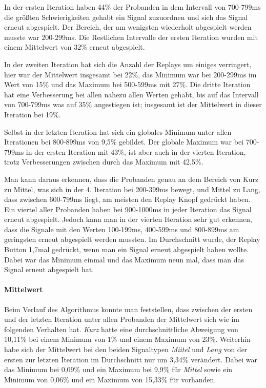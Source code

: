 In der ersten Iteration haben 44\% der Probanden in dem Intervall von 700-799ms die gr{\"o}{\ss}ten Schwierigkeiten gehabt ein Signal zuzuordnen und sich das Signal erneut abgespielt. 
Der Bereich, der am wenigsten wiederholt abgespielt werden musste war 200-299ms. 
Die Restlichen Intervalle der ersten Iteration wurden mit einem Mittelwert von 32\% erneut abgespielt.

In der zweiten Iteration hat sich die Anzahl der Replays um einiges verringert, hier war der Mittelwert insgesamt bei 22\%, das Minimum war bei 200-299ms im Wert von 15\% und das Maximum bei 500-599ms mit 27\%.  
Die dritte Iteration hat eine Verbesserung bei allen nahezu allen Werten gehabt, bis auf das Intervall von 700-799ms was auf 35\% angestiegen ist; insgesamt ist der Mittelwert in dieser Iteration bei 19\%. 

Selbst in der letzten Iteration hat sich ein globales Minimum unter allen Iterationen bei 800-899ms von 9,5\% gebildet. Der globale Maximum war bei 700-799ms in der ersten Iteration mit 43\%, ist aber auch in der vierten Iteration, trotz Verbesserungen zwischen durch das Maximum mit 42,5\%. 

Man kann daraus erkennen, dass die Probanden genau an dem Bereich von Kurz zu Mittel, was sich in der 4. Iteration bei 200-399ms bewegt, und Mittel zu Lang, dass zwischen 600-799ms liegt, am meisten den Replay Knopf gedr{\"u}ckt haben. 
Ein viertel aller Probanden haben bei 900-1000ms in jeder Iteration das Signal erneut abgespielt. 
Jedoch kann man in der vierten Iteration sehr gut erkennen, dass die Signale mit den Werten 100-199ms, 400-599ms und 800-899ms am geringsten erneut abgespielt werden mussten.
Im Durchschnitt wurde, der Replay Button 1,7mal gedr{\"u}ckt, wenn man ein Signal erneut abgespielt haben wollte. 
Dabei war das Minimum einmal und das Maximum neun mal, dass man das Signal erneut abgespielt hat.

\paragraph{Mittelwert}
Beim Verlauf des Algorithmus konnte man feststellen, dass zwischen der ersten und der letzten Iteration unter allen Probanden der Mittelwert sich wie im folgenden Verhalten hat. 
\textit{Kurz} hatte eine durchschnittliche Abweigung von 10,11\% bei einem Minimum von 1\% und einem Maximum von 23\%. 
Weiterhin habe sich der Mittelwert bei den beiden Signaltypen \textit{Miitel} und \textit{Lang} von der ersten zur letzten Iteration im Durchschnitt nur um 3,34\% ver{\"a}ndert.
Dabei war das Minimum bei 0,09\% und ein Maximum bei 9,9\% f{\"u}r \textit{Mittel} sowie ein Minimum von 0,06\% und ein Maximum von 15,33\% f{\"u}r  vorhanden.

